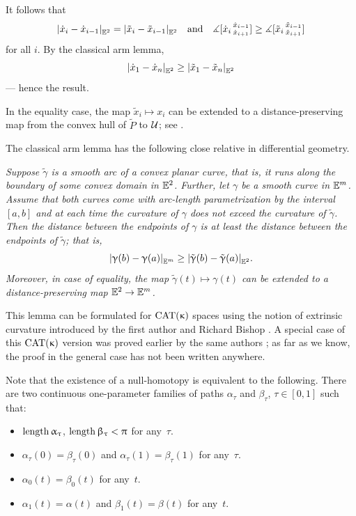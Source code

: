 It follows that
\[
\dist{\dot x_i}{\dot x_{i-1}}{\EE^2}
=
\dist{\tilde x_i}{\tilde x_{i-1}}{\EE^2}
\quad \text{and}\quad
\mangle\hinge{\dot x_i}{\dot x_{i-1}}{\dot x_{i+1}}
\ge
\mangle\hinge{\tilde x_i}{\tilde x_{i-1}}{\tilde x_{i+1}}
\]
for all $i$.
By the classical arm lemma,
\[\dist{\dot x_1}{\dot x_{n}}{\EE^2}
\ge
\dist{\tilde x_1}{\tilde x_{n}}{\EE^2}\]
--- hence the result.

In the equality case, the map $\tilde x_i\mapsto x_i$ can be extended to a distance-preserving map from the convex hull of $\tilde P$ to $\mathcal{U}$; see \cite[9.63]{alexander-kapovitch-petrunin-2025}.

The classical arm lemma has the following close relative in differential geometry.

\textit{Suppose $\tilde\gamma$ is a smooth arc of a convex planar curve, that is, it runs along the boundary of some convex domain in $\mathbb{E}^2$.
Further, let $\gamma$ be a smooth curve in $\mathbb{E}^m$.
Assume that both curves come with arc-length parametrization by the interval $[a,b]$ and at each time the curvature of $\gamma$ does not exceed the curvature of $\tilde\gamma$.
Then the distance between the endpoints of $\gamma$ is at least the distance between the endpoints of $\tilde\gamma$; that is,
\[\dist{\gamma(b)}{\gamma(a)}{\EE^m} \ge \dist{\tilde\gamma(b)}{\tilde\gamma(a)}{\EE^2}.\]
Moreover, in case of equality, the map $\tilde\gamma(t)\mapsto \gamma(t)$ can be extended to a distance-preserving map $\EE^2\to\EE^m$.}

\medskip

This lemma can be formulated for $\mathrm{CAT}(\upkappa)$ spaces using the notion of extrinsic curvature introduced by the first author and Richard Bishop \cite{alexander-bishop-2006,alexander-bishop-2010}.
A special case of this $\mathrm{CAT}(\upkappa)$ version was proved earlier by the same authors \cite{alexander-bishop-1998};
as far as we know, the proof in  the general case has not been written anywhere.

Note that the existence of a null-homotopy is equivalent to the following.
There are two continuous one-parameter families of paths $\alpha_\tau$ and $\beta_\tau$, $\tau\in[0,1]$
such that: 
\begin{itemize}
\item $\mathop{\rm length}\nolimits\upalpha_\uptau$, $\mathop{\rm length}\nolimits\upbeta_\uptau<\uppi$ for any~$\tau$.
\item $\alpha_\tau(0)=\beta_\tau(0)$ and $\alpha_\tau(1)=\beta_\tau(1)$ for any~$\tau$.
\item $\alpha_0(t)=\beta_0(t)$ for any~$t$.
\item $\alpha_1(t)=\alpha(t)$ and $\beta_1(t)=\beta(t)$ for any~$t$.
\end{itemize}

